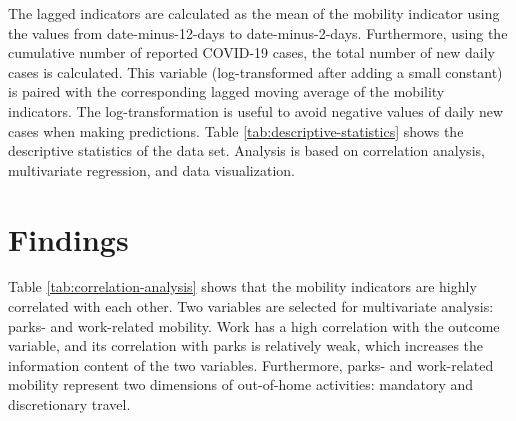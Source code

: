 \documentclass[]{elsarticle} %
\begin{document}
The lagged indicators are calculated as the mean of the mobility
indicator using the values from date-minus-12-days to date-minus-2-days.
Furthermore, using the cumulative number of reported COVID-19 cases, the
total number of new daily cases is calculated. This variable
(log-transformed after adding a small constant) is paired with the
corresponding lagged moving average of the mobility indicators. The
log-transformation is useful to avoid negative values of daily new cases
when making predictions. Table \ref{tab:descriptive-statistics} shows
the descriptive statistics of the data set. Analysis is based on
correlation analysis, multivariate regression, and data visualization.

\hypertarget{findings}{%
\section{Findings}\label{findings}}

Table \ref{tab:correlation-analysis} shows that the mobility indicators
are highly correlated with each other. Two variables are selected for
multivariate analysis: parks- and work-related mobility. Work has a high
correlation with the outcome variable, and its correlation with parks is
relatively weak, which increases the information content of the two
variables. Furthermore, parks- and work-related mobility represent two
dimensions of out-of-home activities: mandatory and discretionary
travel.

\begin{table}[H]

\caption{\label{tab:check-correlations}\label{tab:correlation-analysis}Simple correlation between log(New Cases) and the mobility indicators}
\centering
{}
\end{table}
\end{document}
